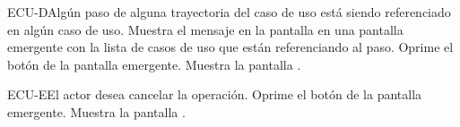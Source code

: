 	\begin{UCtrayectoriaA}{ECU-D}{Algún paso de alguna trayectoria del caso de uso está siendo referenciado en algún caso de uso.}
		\UCpaso[\UCsist] Muestra el mensaje  en la pantalla  en una pantalla emergente con la lista de casos de uso que están referenciando al paso.
		\UCpaso[\UCactor] Oprime el botón  de la pantalla emergente.
		\UCpaso[\UCsist] Muestra la pantalla .
	\end{UCtrayectoriaA}

	\begin{UCtrayectoriaA}{ECU-E}{El actor desea cancelar la operación.}
		\UCpaso[\UCactor] Oprime el botón  de la pantalla emergente.
		\UCpaso[\UCsist] Muestra la pantalla .
	\end{UCtrayectoriaA}
	

